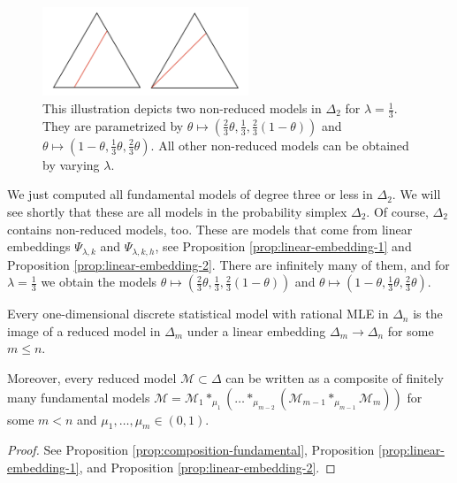 \begin{example}
\begin{figure}[H]
    \includegraphics[width=0.55\textwidth]{assets/non-red-models-delta-2.png}
    \caption{This illustration depicts two non-reduced models in \( \Delta_2 \) for \( \lambda = \frac{1}{3} \). They are parametrized by \( \theta \mapsto (\frac{2}{3}\theta, \frac{1}{3}, \frac{2}{3}(1 - \theta)) \) and \( \theta \mapsto (1-\theta, \frac{1}{3}\theta, \frac{2}{3}\theta) \). All other non-reduced models can be obtained by varying \( \lambda \).} 
\end{figure}

We just computed all fundamental models of degree three or less in \( \Delta_2 \). We will see shortly that these are all models in the probability simplex \( \Delta_2 \). Of course, \( \Delta_2 \) contains non-reduced models, too. These are models that come from linear embeddings \( \Psi_{\lambda,k} \) and \( \Psi_{\lambda,k,h} \), see Proposition \ref{prop:linear-embedding-1} and Proposition \ref{prop:linear-embedding-2}. There are infinitely many of them, and for \( \lambda = \frac{1}{3} \) we obtain the models \( \theta \mapsto (\frac{2}{3}\theta, \frac{1}{3}, \frac{2}{3}(1 - \theta)) \) and \( \theta \mapsto (1-\theta, \frac{1}{3}\theta, \frac{2}{3}\theta) \).
\end{example}

\begin{theorem}\label{thm:classification-jekns}
    Every one-dimensional discrete statistical model with rational MLE in \( \Delta_n \) is the image of a reduced model in \( \Delta_m \) under a linear embedding \( \Delta_m \to \Delta_n \) for some \( m \leq n \).

    Moreover, every reduced model \( \mathcal{M} \subset \Delta \) can be written as a composite of finitely many fundamental models \( \mathcal{M} = \mathcal{M}_1 *_{\mu_1} ( \dots *_{\mu_{m-2}}( \mathcal{M}_{m-1} *_{\mu_{m-1}} \mathcal{M}_m) ) \)
    for some \( m < n \) and \( \mu_1, \dots, \mu_m \in (0,1) \).
\end{theorem}

\begin{proof}
    See Proposition \ref{prop:composition-fundamental}, Proposition \ref{prop:linear-embedding-1}, and Proposition \ref{prop:linear-embedding-2}.
\end{proof}

